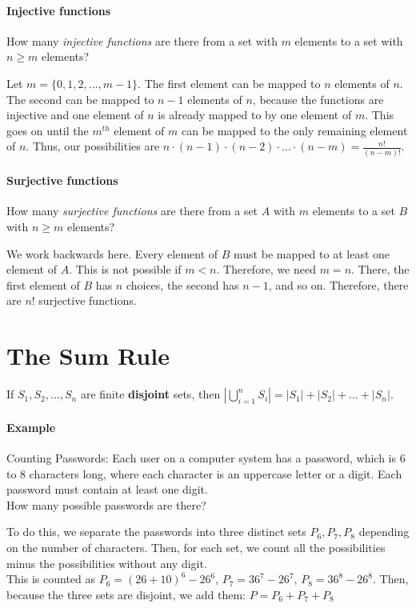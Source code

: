 \documentclass[10pt,a4paper]{book}
\begin{document}
\paragraph{Injective functions}
$ $\\
How many \textit{injective functions} are there from a set with $m$ elements to a set with $n\geq m$ elements?\par 
Let $m= \{0,1,2,...,m-1\}$. The first element can be mapped to $n$ elements of $n$. The second can be mapped to $n-1$ elements of $n$, because the functions are injective and one element of $n$ is already mapped to by one element of $m$. This goes on until the $m^{th}$ element of $m$ can be mapped to the only remaining element of $n$. Thus, our possibilities are $n\cdot (n-1)\cdot (n-2)\cdot\ldots\cdot (n-m)=\frac{n!}{(n-m)!}$.
\paragraph{Surjective functions}
$ $\\
How many \textit{surjective functions} are there from a set $A$ with $m$ elements to a set $B$ with $n\geq m$ elements?\par 
We work backwards here. Every element of $B$ must be mapped to at least one element of $A$. This is not possible if $m<n$. Therefore, we need $m=n$. There, the first element of $B$ has $n$ choices, the second has $n-1$, and so on. Therefore, there are $n!$ surjective functions.
\section{The Sum Rule}
If $S_1,S_2,...,S_n$ are finite \textbf{disjoint} sets, then $|\bigcup_{i=1}^{n} S_i| = |S_1| + |S_2| + ... + |S_n|$.
\paragraph*{Example}
Counting Passwords: Each user on a computer system has a password, which is 6 to 8 characters long, where each character is an uppercase letter or a digit. Each password must contain at least one digit. \\
How many possible passwords are there?\par 
To do this, we separate the passwords into three distinct sets $P_6,P_7,P_8$ depending on the number of characters. Then, for each set, we count all the possibilities minus the possibilities without any digit.\\
This is counted as $P_6=(26+10)^6-26^6$, $P_7=36^7-26^7$, $P_8=36^8-26^8$. Then, because the three sets are disjoint, we add them: $P=P_6+P_7+P_8$
\end{document}

